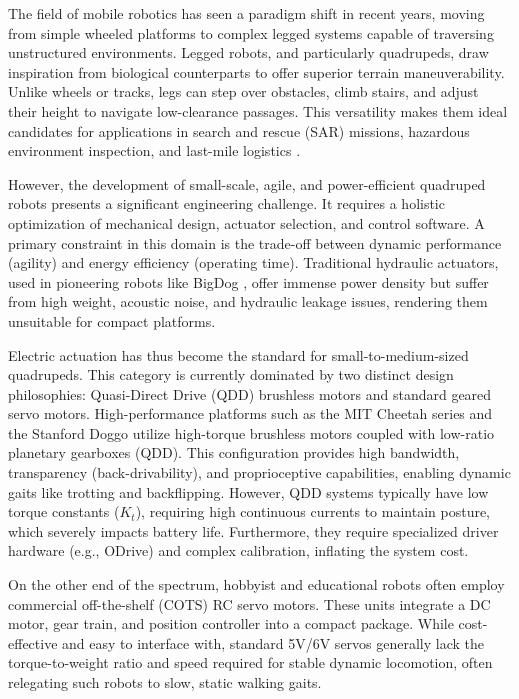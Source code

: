 \documentclass[pdflatex,sn-mathphys-num]{sn-jnl}%
\theoremstyle{thmstyleone}%
\theoremstyle{thmstyletwo}%
\theoremstyle{thmstylethree}%
\begin{document}
The field of mobile robotics has seen a paradigm shift in recent years, moving from simple wheeled platforms to complex legged systems capable of traversing unstructured environments. Legged robots, and particularly quadrupeds, draw inspiration from biological counterparts to offer superior terrain maneuverability. Unlike wheels or tracks, legs can step over obstacles, climb stairs, and adjust their height to navigate low-clearance passages. This versatility makes them ideal candidates for applications in search and rescue (SAR) missions, hazardous environment inspection, and last-mile logistics \cite{Fan2024}.

However, the development of small-scale, agile, and power-efficient quadruped robots presents a significant engineering challenge. It requires a holistic optimization of mechanical design, actuator selection, and control software. A primary constraint in this domain is the trade-off between dynamic performance (agility) and energy efficiency (operating time). Traditional hydraulic actuators, used in pioneering robots like BigDog \cite{Raibert2008}, offer immense power density but suffer from high weight, acoustic noise, and hydraulic leakage issues, rendering them unsuitable for compact platforms.

Electric actuation has thus become the standard for small-to-medium-sized quadrupeds. This category is currently dominated by two distinct design philosophies: Quasi-Direct Drive (QDD) brushless motors and standard geared servo motors. High-performance platforms such as the MIT Cheetah series \cite{Bosworth2015} and the Stanford Doggo \cite{Kau2019} utilize high-torque brushless motors coupled with low-ratio planetary gearboxes (QDD). This configuration provides high bandwidth, transparency (back-drivability), and proprioceptive capabilities, enabling dynamic gaits like trotting and backflipping. However, QDD systems typically have low torque constants ($K_t$), requiring high continuous currents to maintain posture, which severely impacts battery life. Furthermore, they require specialized driver hardware (e.g., ODrive) and complex calibration, inflating the system cost.

On the other end of the spectrum, hobbyist and educational robots often employ commercial off-the-shelf (COTS) RC servo motors. These units integrate a DC motor, gear train, and position controller into a compact package. While cost-effective and easy to interface with, standard 5V/6V servos generally lack the torque-to-weight ratio and speed required for stable dynamic locomotion, often relegating such robots to slow, static walking gaits.
\end{document}
